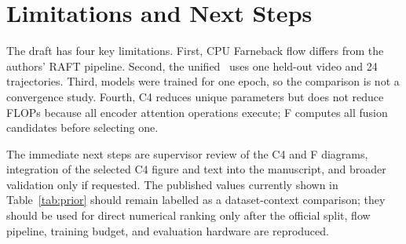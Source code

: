 \section{Limitations and Next Steps}
The draft has four key limitations. First, CPU Farneback flow differs from the authors' RAFT pipeline. Second, the unified \poc\ uses one held-out video and 24 trajectories. Third, models were trained for one epoch, so the comparison is not a convergence study. Fourth, C4 reduces unique parameters but does not reduce FLOPs because all encoder attention operations execute; F computes all fusion candidates before selecting one.

The immediate next steps are supervisor review of the C4 and F diagrams, integration of the selected C4 figure and text into the manuscript, and broader validation only if requested. The published values currently shown in Table~\ref{tab:prior} should remain labelled as a dataset-context comparison; they should be used for direct numerical ranking only after the official split, flow pipeline, training budget, and evaluation hardware are reproduced.
